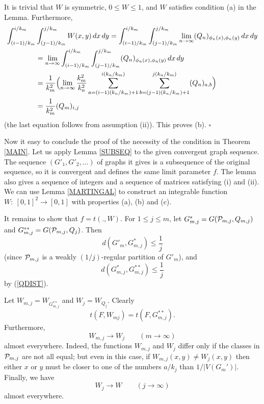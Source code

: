 \documentclass[fleqn]{article}
\newenvironment{proof}{\noindent{\bf Proof. }}{\hfill$\square$\medskip}
\begin{document}
\begin{proof}
It is trivial that $W$ is symmetric, $0\le W\le 1$, and $W$ satisfies
condition (a) in the Lemma. Furthermore,
\begin{align*}
\int_{(i-1)/k_m}^{i/k_m}&\int_{(j-1)/k_m}^{j/k_m} W(x,y)\,dx\,dy =
\int_{(i-1)/k_m}^{i/k_m}\int_{(j-1)/k_m}^{j/k_m} \lim_{n\to\infty}
(Q_n)_{\phi_n(x),\phi_n(y)}\,dx\,dy\\ &=\lim_{n\to\infty}
\int_{(i-1)/k_m}^{i/k_m}\int_{(j-1)/k_m}^{j/k_m}
(Q_n)_{\phi_n(x),\phi_n(y)}\,dx\,dy \\
&=\frac{1}{k_m^2}\Bigl(\lim_{n\to\infty}\frac{k_m^2}{k_n^2}
\sum_{a=(i-1)(k_n/k_m)+1}^{i(k_n/k_m)}
\sum_{b=(j-1)(k_n/k_m)+1}^{j(k_n/k_m)}(Q_n)_{a,b}\Bigr)\\
&=\frac{1}{k_m^2}(Q_m)_{i,j}
\end{align*}
(the last equation follows from assumption (ii)). This proves (b).
\end{proof}

Now it easy to conclude the proof of the necessity of the condition
in Theorem \ref{MAIN}. Let us apply Lemma \ref{SUBSEQ} to the given
convergent graph sequence. The sequence $(G'_1,G'_2,\dots)$ of graphs
it gives is a subsequence of the original sequence, so it is
convergent and defines the same limit parameter $f$. The lemma also
gives a sequence of integers and a sequence of matrices satisfying
(i) and (ii). We can use Lemma \ref{MARTINGAL} to construct an
integrable function $W:~[0,1]^2\to[0,1]$ with properties (a), (b) and
(c).

It remains to show that $f=t(.,W)$. For $1\le j\le m$, let
$G^*_{m,j}=G({\cal P}_{m,j},Q_{m,j})$ and $G_{m,j}^{**}=G({\cal P}_{m,j},Q_j)$.
Then
\begin{equation}\label{GM-GMJ}
d(G'_m,G^*_{m,j})\le \frac{1}{j}
\end{equation}
(since ${\cal P}_{m,j}$ is a weakly $(1/j)$-regular partition of $G'_m$),
and
\begin{equation}\label{GMJ-GMJ}
d(G^*_{m,j},G^{**}_{m,j})\le \frac{1}{j}
\end{equation}
by (\ref{QDIST}).

Let $W_{m,j}=W_{G_{m,j}^{**}}$ and $W_j=W_{Q_j}$. Clearly
\[
t(F,W_{mj})=t(F,G_{m,j}^{**}).
\]
Furthermore,
\begin{equation}\label{WMJ-WJ}
W_{m,j}\to W_j\qquad (m\to\infty)
\end{equation}
almost everywhere. Indeed, the functions $W_{m,j}$ and $W_j$ differ
only if the classes in ${\cal P}_{m,j}$ are not all equal; but even in
this case, if $W_{m,j}(x,y)\not=W_j(x,y)$ then either $x$ or $y$ must
be closer to one of the numbers $a/k_j$ than $1/|V(G_m')|$. Finally,
we have
\begin{equation}\label{WJ-W}
W_j\to W\qquad (j\to\infty)
\end{equation}
almost everywhere.
\end{document}
